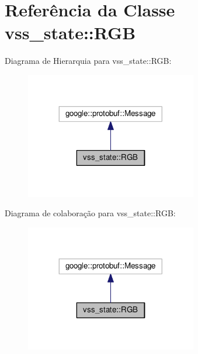 \hypertarget{classvss__state_1_1RGB}{}\section{Referência da Classe vss\+\_\+state\+:\+:R\+GB}
\label{classvss__state_1_1RGB}


Diagrama de Hierarquia para vss\+\_\+state\+:\+:R\+GB\+:\nopagebreak
\begin{figure}[H]
\begin{center}
\leavevmode
\includegraphics[width=212pt]{classvss__state_1_1RGB__inherit__graph}
\end{center}
\end{figure}


Diagrama de colaboração para vss\+\_\+state\+:\+:R\+GB\+:\nopagebreak
\begin{figure}[H]
\begin{center}
\leavevmode
\includegraphics[width=212pt]{classvss__state_1_1RGB__coll__graph}
\end{center}
\end{figure}
